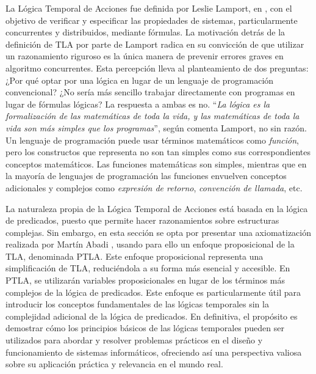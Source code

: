 La Lógica Temporal de Acciones fue definida por Leslie Lamport, en \cite{lamport1994temporal}, con el objetivo de verificar y especificar las propiedades de sistemas, particularmente concurrentes y distribuidos, mediante fórmulas. La motivación detrás de la definición de TLA por parte de Lamport radica en su convicción de que utilizar un razonamiento riguroso es la única manera de prevenir errores graves en algoritmo concurrentes. Esta percepción lleva al planteamiento de dos preguntas: ¿Por qué optar por una lógica en lugar de un lenguaje de programación convencional? ¿No sería más sencillo trabajar directamente con programas en lugar de fórmulas lógicas? La respuesta a ambas es no. ``\textit{La lógica es la formalización de las matemáticas de toda la vida, y las matemáticas de toda la vida son más simples que los programas}'', según comenta Lamport, no sin razón. Un lenguaje de programación puede usar términos matemáticos como \textit{función}, pero los constructos que representa no son tan simples como sus correspondientes conceptos matemáticos. Las funciones matemáticas son simples, mientras que en la mayoría de lenguajes de programación las funciones envuelven conceptos adicionales y complejos como \textit{expresión de retorno}, \textit{convención de llamada}, etc.

La naturaleza propia de la Lógica Temporal de Acciones está basada en la lógica de predicados, puesto que permite hacer razonamientos sobre estructuras complejas. Sin embargo, en esta sección se opta por presentar una axiomatización realizada por Martín Abadi \cite{abadi1990axiomatization}, usando para ello un enfoque proposicional de la TLA, denominada PTLA. Este enfoque proposicional representa una simplificación de TLA, reduciéndola a su forma más esencial y accesible. En PTLA, se utilizarán variables proposicionales en lugar de los términos más complejos de la lógica de predicados. Este enfoque es particularmente útil para introducir los conceptos fundamentales de las lógicas temporales sin la complejidad adicional de la lógica de predicados. En definitiva, el propósito es demostrar cómo los principios básicos de las lógicas temporales pueden ser utilizados para abordar y resolver problemas prácticos en el diseño y funcionamiento de sistemas informáticos, ofreciendo así una perspectiva valiosa sobre su aplicación práctica y relevancia en el mundo real.

